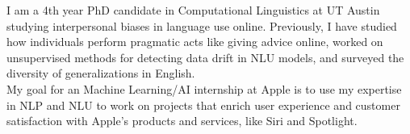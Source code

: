 I am a 4th year PhD candidate in Computational Linguistics at UT Austin studying interpersonal biases in language use online. Previously, I have studied how individuals perform pragmatic acts like giving advice online, worked on unsupervised methods for detecting data drift in NLU models, and surveyed the diversity of generalizations in English.\\
My goal for an Machine Learning/AI internship at Apple is to use my expertise in NLP and NLU to work on projects that enrich user experience and customer satisfaction with Apple's products and services, like Siri and Spotlight.
